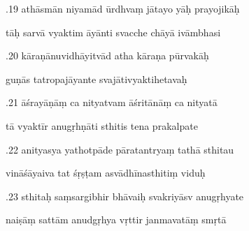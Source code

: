 \documentclass[article,12pt,a4paper]{memoir}%
\newcounter{parCount}
\begin{document}
	  
	  \pstart {}.19 athāsmān niyamād ūrdhvaṃ jātayo yāḥ prayojikāḥ 
	{}
	\pend%
      

	  
	  \pstart \leavevmode%
	tāḥ sarvā vyaktim āyānti svacche chāyā ivāmbhasi 
	{}
	\pend%
      

	  
	  \pstart {}.20 kāraṇānuvidhāyitvād atha kāraṇa pūrvakāḥ 
	{}
	\pend%
      

	  
	  \pstart \leavevmode%
	guṇās tatropajāyante svajātivyaktihetavaḥ 
	{}
	\pend%
      

	  
	  \pstart {}.21 āśrayāṇāṃ ca nityatvam āśritānāṃ ca nityatā 
	{}
	\pend%
      

	  
	  \pstart \leavevmode%
	tā vyaktīr anugṛhṇāti sthitis tena prakalpate 
	{}
	\pend%
      

	  
	  \pstart {}.22 anityasya yathotpāde pāratantryaṃ tathā sthitau 
	{}
	\pend%
      

	  
	  \pstart \leavevmode%
	vināśāyaiva tat śṛṣṭam asvādhīnasthitiṃ viduḥ 
	{}
	\pend%
      

	  
	  \pstart {}.23 sthitaḥ saṃsargibhir bhāvaiḥ svakriyāsv anugṛhyate 
	{}
	\pend%
      

	  
	  \pstart \leavevmode%
	naiṣāṃ sattām anudgṛhya vṛttir janmavatāṃ smṛtā 
	{}
	\pend%
      
\end{document}
